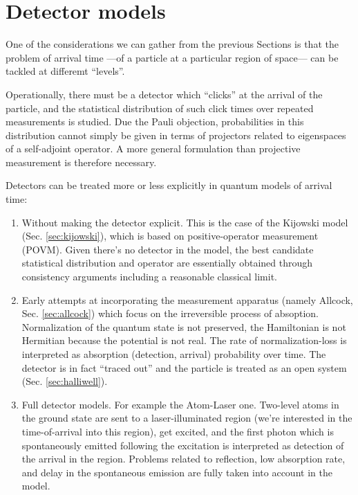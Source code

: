 \section{Detector models}\label{sec:hist:detect}

One of the considerations we can gather from the previous Sections
is that 
the problem of arrival time ---of a particle at a particular region of space---
can be tackled at differemt ``levels''. 

Operationally, there must be a detector which
``clicks'' at the arrival of the particle, and the statistical distribution of
such click times over repeated measurements is studied. Due the Pauli objection,
probabilities in this distribution cannot simply be given in terms of projectors related to eigenspaces of a self-adjoint operator.
A more general formulation than projective measurement is therefore necessary.

Detectors can be treated more or less explicitly in quantum models of arrival time:
\begin{enumerate}
  \item
    Without making the detector explicit. This is the case of the Kijowski model (Sec. \ref{sec:kijowski}),
    which is based on positive-operator measurement (POVM). Given there's no detector in the model,
    the best candidate statistical distribution and operator are essentially obtained
    through consistency arguments including a reasonable classical limit.
  \item
    Early attempts at incorporating the measurement apparatus
    (namely Allcock, Sec. \ref{sec:allcock}) which
    focus on the irreversible process of absoption.
    Normalization of the quantum state is not preserved, the Hamiltonian is not Hermitian
    because the potential is not real. The rate of normalization-loss is interpreted as
    absorption (detection, arrival) probability over time. The detector is in fact
    ``traced out'' and the particle is treated as an open system (Sec. \ref{sec:halliwell}).
  \item
    Full detector models. For example the Atom-Laser one. Two-level atoms in the ground state
    are sent to a laser-illuminated region (we're interested in the time-of-arrival into this region),
    get excited, and the first photon which is spontaneously emitted following the excitation
    is interpreted as detection of the arrival in the region. Problems related to
    reflection, low absorption rate, and delay in the spontaneous emission are fully taken into account in the model.
\end{enumerate}

